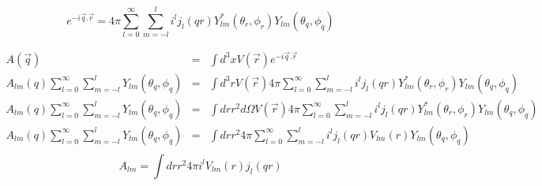 \documentclass{article}
\begin{document}
\begin{equation}
\label{ decom 1}
e^{-i \vec{q} . \vec{r}}=
4 \pi \sum_{l=0}^{\infty} 
\sum_{m=-l}^{l} i^{l} j_{l}(q r)
Y_{lm}^{*}(\theta_{r},\phi_{r}) 
Y_{lm}(\theta_{q},\phi_{q})
\end{equation}

\begin{eqnarray*}
A(\vec{q})&=&\int d^{3}x  V(\vec{r}) e^{-i \vec{q} . \vec{r}} \\
A_{lm}(q) 
\sum_{l=0}^{\infty} 
\sum_{m=-l}^{l} Y_{lm}(\theta_{q},\phi_{q}) 
 &=&\int d^{3}r  V(\vec{r}) 
4 \pi \sum_{l=0}^{\infty} 
\sum_{m=-l}^{l} i^{l} j_{l}(q r)
Y_{lm}^{*}(\theta_{r},\phi_{r}) 
Y_{lm}(\theta_{q},\phi_{q})
\\
A_{lm}(q) 
\sum_{l=0}^{\infty} 
\sum_{m=-l}^{l} Y_{lm}(\theta_{q},\phi_{q}) 
 &=&\int  dr r^{2} d\Omega  V(\vec{r}) 
4 \pi \sum_{l=0}^{\infty} 
\sum_{m=-l}^{l} i^{l} j_{l}(q r)
Y_{lm}^{*}(\theta_{r},\phi_{r}) 
Y_{lm}(\theta_{q},\phi_{q})
\\
A_{lm}(q) 
\sum_{l=0}^{\infty} 
\sum_{m=-l}^{l} Y_{lm}(\theta_{q},\phi_{q}) 
 &=&\int dr r^{2} 
4 \pi \sum_{l=0}^{\infty} 
\sum_{m=-l}^{l} i^{l} j_{l}(q r)
V_{lm}(r)
Y_{lm}(\theta_{q},\phi_{q})
\\
\end{eqnarray*}
\begin{equation}
A_{lm}=\int dr r^{2}  4 \pi i^{l} V_{lm}(r) j_{l}(q r)
\label{int 1}
\end{equation}
\end{document}
